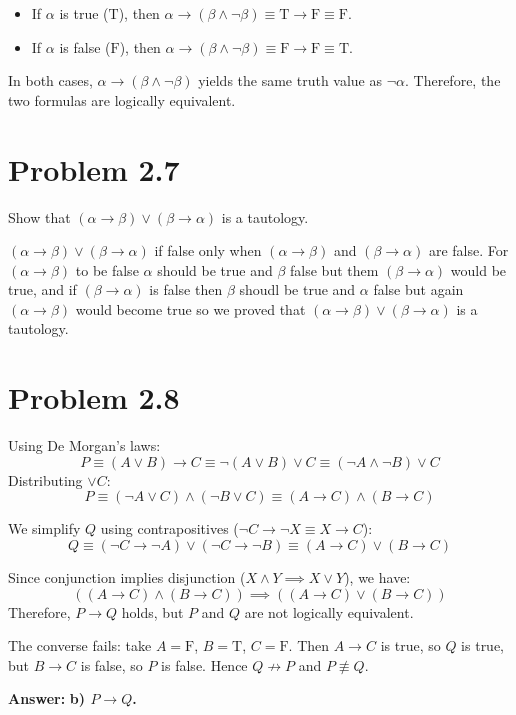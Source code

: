 \documentclass[12pt]{article}
\begin{document}
\begin{itemize}
    \item If $\alpha$ is true ($\text{T}$), then $\alpha \to (\beta \land \neg\beta) \equiv \text{T} \to \text{F} \equiv \text{F}$.
    \item If $\alpha$ is false ($\text{F}$), then $\alpha \to (\beta \land \neg\beta) \equiv \text{F} \to \text{F} \equiv \text{T}$.
\end{itemize}

In both cases, $\alpha \to (\beta \land \neg\beta)$ yields the same truth value as $\neg\alpha$. Therefore, the two formulas are logically equivalent.


\section*{Problem 2.7}
\noindent Show that $(\alpha\to\beta)\lor(\beta\to\alpha)$ is a tautology.

$(\alpha\to\beta)\lor(\beta\to\alpha)$ if false only when $(\alpha\to\beta)$ and 
$(\beta\to\alpha)$ are false. For $(\alpha\to\beta)$ to be false $\alpha$ should be true 
and  $\beta$ false but them $(\beta\to\alpha)$ would be true, and if  $(\beta\to\alpha)$ is false then $\beta$ shoudl be true and $\alpha$ false but again $(\alpha\to\beta)$  would become true so we proved that  $(\alpha\to\beta)\lor(\beta\to\alpha)$ is a tautology.
\newpage
\section*{Problem 2.8}
Using De Morgan's laws:
\[
P \equiv (A \lor B) \to C \equiv \neg(A \lor B) \lor C \equiv (\neg A \land \neg B) \lor C
\]
Distributing $\lor C$:
\[
P \equiv (\neg A \lor C) \land (\neg B \lor C) \equiv (A \to C) \land (B \to C)
\]

We simplify $Q$ using contrapositives ($\neg C \to \neg X \equiv X \to C$):
\[
Q \equiv (\neg C \to \neg A) \lor (\neg C \to \neg B) \equiv (A \to C) \lor (B \to C)
\]

Since conjunction implies disjunction ($X \land Y \implies X \lor Y$), we have:
\[
((A \to C) \land (B \to C)) \implies ((A \to C) \lor (B \to C))
\]
Therefore, $P \to Q$ holds, but $P$ and $Q$ are not logically equivalent.

The converse fails: take $A=\text{F}$, $B=\text{T}$, $C=\text{F}$. Then $A \to C$ is true,
so $Q$ is true, but $B \to C$ is false, so $P$ is false. Hence $Q \not\to P$
and $P \not\equiv Q$.

\textbf{Answer:} \textbf{b) $P \to Q$.}
 
\end{document}
